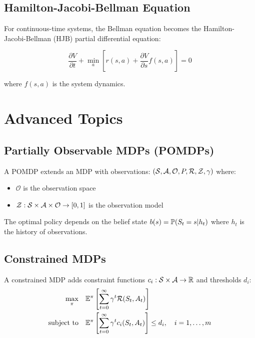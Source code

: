 \subsection{Hamilton-Jacobi-Bellman Equation}

For continuous-time systems, the Bellman equation becomes the Hamilton-Jacobi-Bellman (HJB) partial differential equation:

\begin{equation}
\frac{\partial V}{\partial t} + \min_a \left[r(s,a) + \frac{\partial V}{\partial s} f(s,a)\right] = 0
\end{equation}

where $f(s,a)$ is the system dynamics.

\section{Advanced Topics}

\subsection{Partially Observable MDPs (POMDPs)}

\begin{definition}[POMDP]
A POMDP extends an MDP with observations: $(\mathcal{S}, \mathcal{A}, \mathcal{O}, P, \mathcal{R}, \mathcal{Z}, \gamma)$ where:
\begin{itemize}
    \item $\mathcal{O}$ is the observation space
    \item $\mathcal{Z}: \mathcal{S} \times \mathcal{A} \times \mathcal{O} \to [0,1]$ is the observation model
\end{itemize}
\end{definition}

The optimal policy depends on the belief state $b(s) = \mathbb{P}(S_t = s | h_t)$ where $h_t$ is the history of observations.

\subsection{Constrained MDPs}

\begin{definition}
A constrained MDP adds constraint functions $c_i: \mathcal{S} \times \mathcal{A} \to \mathbb{R}$ and thresholds $d_i$:
\begin{align}
\max_\pi \quad &\mathbb{E}^\pi\left[\sum_{t=0}^\infty \gamma^t \mathcal{R}(S_t, A_t)\right] \\
\text{subject to} \quad &\mathbb{E}^\pi\left[\sum_{t=0}^\infty \gamma^t c_i(S_t, A_t)\right] \leq d_i, \quad i = 1, \ldots, m
\end{align}
\end{definition}

